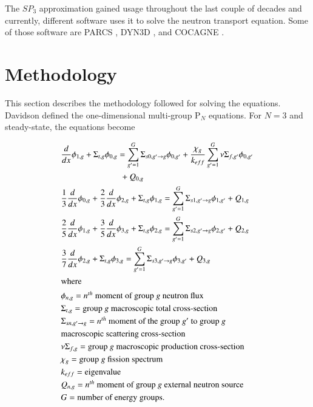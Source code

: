 \documentclass{anstrans}
\begin{document}
The $SP_3$ approximation gained usage throughout the last couple of decades and currently, different software uses it to solve the neutron transport equation.
Some of those software are PARCS \cite{downar_parcs_2004}, DYN3D \cite{beckert_development_2007}, and COCAGNE \cite{fliscounakis_potential_2012}.

\section{Methodology}

This section describes the methodology followed for solving the equations.
Davidson \cite{davidson_neutron_1957} defined the one-dimensional multi-group P$_N$ equations.
For $N=3$ and steady-state, the equations become

\begin{align}
    & \frac{d}{dx} \phi_{1,g} + \Sigma_{t,g} \phi_{0,g} = \sum_{g'=1}^G \Sigma_{s0,g' \rightarrow g} \phi_{0,g'} + \frac{\chi_g}{k_{eff}} \sum_{g'=1}^G \nu\Sigma_{f,g'} \phi_{0,g'} \notag \\ & \quad \quad \quad \quad \quad \quad \quad + Q_{0,g}  \label{eq:P3-0} \\
    & \frac{1}{3} \frac{d}{dx} \phi_{0,g} + \frac{2}{3}\frac{d}{dx}\phi_{2,g} + \Sigma_{t,g} \phi_{1,g} = \sum_{g'=1}^G \Sigma_{s1,g' \rightarrow g} \phi_{1,g'} + Q_{1,g} \label{eq:P3-1} \\
    & \frac{2}{5} \frac{d}{dx}\phi_{1,g} + \frac{3}{5}\frac{d}{dx}\phi_{3,g} + \Sigma_{t,g} \phi_{2,g} = \sum_{g'=1}^G \Sigma_{s2,g' \rightarrow g} \phi_{2,g'} + Q_{2,g} \label{eq:P3-2} \\
    & \frac{3}{7}\frac{d}{dx}\phi_{2,g} + \Sigma_{t,g} \phi_{3,g} = \sum_{g'=1}^G \Sigma_{s3,g' \rightarrow g} \phi_{3,g'} + Q_{3,g} \label{eq:P3-3} \\
    \intertext{where}
    & \phi_{n,g} = \mbox{$n^{th}$ moment of group $g$ neutron flux}  \notag \\ %
    & \Sigma_{t,g} = \mbox{group $g$ macroscopic total cross-section}  \notag \\ %
	& \Sigma_{sn,g' \rightarrow g} = \mbox{$n^{th}$ moment of the group $g'$ to group $g$} \notag \\
	& \mbox{macroscopic scattering cross-section}  \notag \\ %
	& \nu\Sigma_{f,g} = \mbox{group $g$ macroscopic production cross-section}  \notag \\ %
	& \chi_{g} = \mbox{group $g$ fission spectrum}  \notag \\ %
	& k_{eff} = \mbox{eigenvalue}  \notag \\ %
	& Q_{n,g} = \mbox{$n^{th}$ moment of group $g$ external neutron source}  \notag \\  %
	& G = \mbox{number of energy groups}.  \notag %
\end{align}
\end{document}
